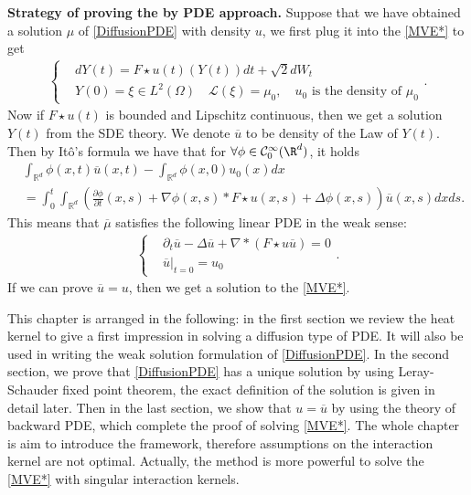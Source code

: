 {\bf Strategy of proving the  by PDE approach.}
Suppose that we have obtained a solution $\mu $ of \autoref{DiffusionPDE} with density $u$, we first plug it into the \autoref{MVE*} to get
 \begin{align*}
   \begin{cases}
    &dY(t) = F\star u(t)(Y(t)) dt + \sqrt{2} dW_t \\
    &Y(0) = \xi \in  L^2(\Omega ) \quad \mathcal{L}(\xi) = \mu_0,\quad u_0 \mbox{ is the density of }\mu_0
  \end{cases}
 .\end{align*}
 Now if $F\star u(t)$ is bounded and Lipschitz continuous, then we get a solution $Y(t)$ from the SDE theory. We denote $\overline{u} $ to be density of the Law of $Y(t)$.
 Then by It\^o's formula we have that for $\forall  \phi \in \mathcal{C}_0^{\infty}(\R^d) $, it holds
\begin{align*}
  &\int_{\mathbb{R}^{d} } \phi (x,t) \overline{u}(x,t)  - \int_{\mathbb{R}^{d} } \phi(x,0) u_0(x) dx \\
  &=  \int_0^{t} \int_{\mathbb{R}^{d} } \left(\frac{\partial \phi }{\partial t}(x,s) + \nabla \phi(x,s)*F\star u(x,s) +  \Delta \phi(x,s)\right)\overline{u}(x,s) dx ds
.\end{align*}
This means that $\overline{\mu } $ satisfies the following linear PDE in the weak sense:
\begin{align}\label{DiffusionBar}
  \begin{cases}
    &\partial_t \overline{u}  - \Delta \overline{u }  + \nabla * (F\star u\overline{u } ) = 0\\
    &\overline{u } \rvert_{t=0}  = u_0
  \end{cases}
.\end{align}
If we can prove $\overline{u} = u $, then we get a solution to the \autoref{MVE*}. 

This chapter is arranged in the following: in the first section we review the heat kernel to give a first impression in solving a diffusion type of PDE. It will also be used in writing the weak solution formulation of \autoref{DiffusionPDE}. In the second section, we prove that  \autoref{DiffusionPDE} has a unique solution by using Leray-Schauder fixed point theorem, the exact definition of the solution is given in detail later. Then in the last section, we show that $u=\overline{u}$ by using the theory of backward PDE, which complete the proof of solving  \autoref{MVE*}. The whole chapter is aim to introduce the framework, therefore assumptions on the interaction kernel are not optimal. Actually, the method is more powerful to solve the \autoref{MVE*} with singular interaction kernels.


